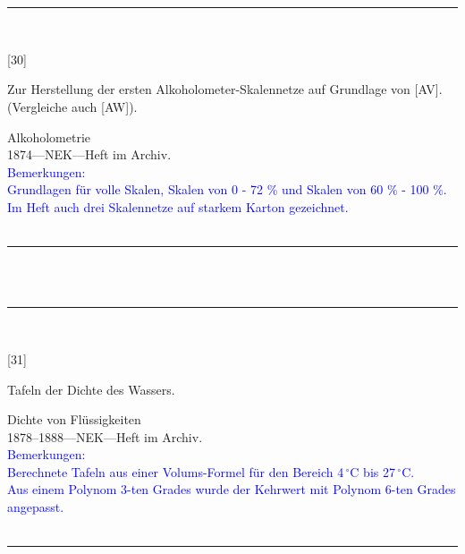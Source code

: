 \\
\vspace*{-2.5pt}\\
\parbox{\textwidth}{%
\rule{\textwidth}{1pt}\vspace*{-3mm}\\
\begin{minipage}[t]{0.15\textwidth}\vspace{0pt}
\Huge\rule[-4mm]{0cm}{1cm}[30]
\end{minipage}
\hfill
\begin{minipage}[t]{0.85\textwidth}\vspace{0pt}
\large Zur Herstellung der ersten Alkoholometer-Skalennetze auf Grundlage von [AV]. (Vergleiche auch [AW]).\rule[-2mm]{0mm}{2mm}
\end{minipage}
{\footnotesize\flushright
Alkoholometrie\\
}
1874\quad---\quad NEK\quad---\quad Heft im Archiv.\\
\textcolor{blue}{Bemerkungen:\\{}
Grundlagen für volle Skalen, Skalen von 0 - 72 \%{} und Skalen von 60 \%{} - 100 \%{}.\\{}
Im Heft auch drei Skalennetze auf starkem Karton gezeichnet.\\{}
}
\\[-15pt]
\rule{\textwidth}{1pt}
}
\\
\vspace*{-2.5pt}\\
\parbox{\textwidth}{%
\rule{\textwidth}{1pt}\vspace*{-3mm}\\
\begin{minipage}[t]{0.15\textwidth}\vspace{0pt}
\Huge\rule[-4mm]{0cm}{1cm}[31]
\end{minipage}
\hfill
\begin{minipage}[t]{0.85\textwidth}\vspace{0pt}
\large Tafeln der Dichte des Wassers.\rule[-2mm]{0mm}{2mm}
\end{minipage}
{\footnotesize\flushright
Dichte von Flüssigkeiten\\
}
1878--1888\quad---\quad NEK\quad---\quad Heft im Archiv.\\
\textcolor{blue}{Bemerkungen:\\{}
Berechnete Tafeln aus einer Volums-Formel für den Bereich 4\,{$^\circ$}C bis 27\,{$^\circ$}C.\\{}
Aus einem Polynom 3-ten Grades wurde der Kehrwert mit Polynom 6-ten Grades angepasst.\\{}
}
\\[-15pt]
\rule{\textwidth}{1pt}
}
